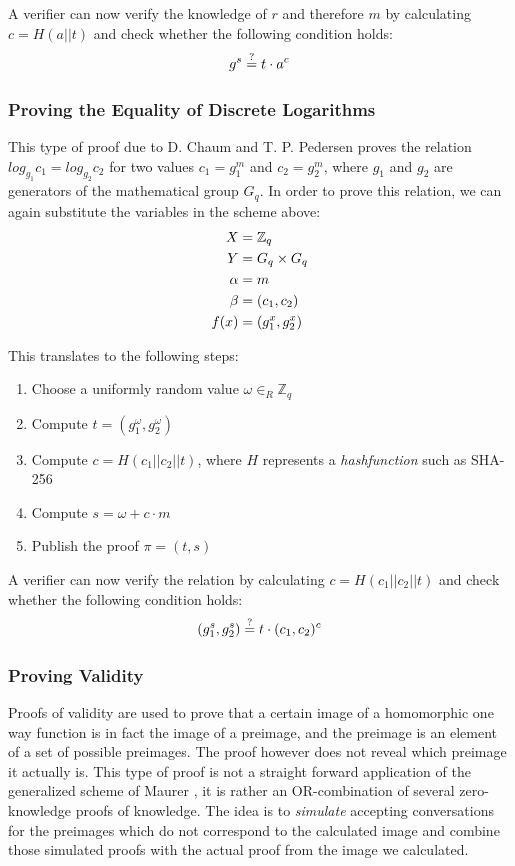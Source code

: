\documentclass[numbers=noenddot, abstract=on, a4paper, headsepline,
footsepline, oneside, draft=off]{scrreprt}
\begin{document}
A verifier can now verify the knowledge of $r$ and therefore $m$ by calculating
$c=H(a||t)$ and check whether the following condition holds:
\begin{equation}
	g^s \stackrel{?}{=} t \cdot a^c \notag
\end{equation}

\subsubsection{Proving the Equality of Discrete Logarithms}
\label{sec:proofeqdlog}
This type of proof due to D. Chaum and T. P. Pedersen \cite{CP93}
 proves the relation $log_{g_1} c_1 = log_{g_2} c_2 $ for two values $c_1 =
g_1^m$ and $c_2 = g_2^m$, where $g_1$ and $g_2$ are generators of the
mathematical group $G_q$. In order to prove this relation, we can again
substitute the variables in the scheme above:
\begin{align}
  X &= \mathbb{Z}_q \notag \\
  Y &= G_q \times G_q \notag \\
  \alpha &=m \notag \\
  \beta &=(c_1, c_2) \notag \\
  f(x) &= (g_1^x, g_2^x) \notag
\end{align} 

This translates to the following steps:

\begin{enumerate}
  \item Choose a uniformly random value $\omega \in_R \mathbb{Z}_q$
  \item Compute $t=(g_1^\omega, g_2^\omega)$
  \item Compute $c=H(c_1||c_2||t)$, where $H$ represents a
  \emph{hashfunction} such as SHA-256
  \item Compute $s=\omega + c \cdot m$
  \item Publish the proof $\pi = (t,s)$
\end{enumerate}

A verifier can now verify the relation by calculating
$c=H(c_1||c_2||t)$ and check whether the following condition holds:
\begin{equation}
	(g_1^s, g_2^s) \stackrel{?}{=} t \cdot (c_1, c_2)^c \notag
\end{equation}


\subsubsection{Proving Validity}
\label{sec:proofofvalidity}
Proofs of validity are used to prove that a certain image of a homomorphic one
way function is in fact the image of a preimage, and the preimage is an element
of a set of possible preimages. The proof however does not reveal which preimage
it actually is. This type of proof is not a straight forward application of the
generalized scheme of Maurer \cite{Maurer09}, it is rather an OR-combination of
several zero-knowledge proofs of knowledge. The idea is to \emph{simulate}
accepting conversations for the preimages which do not correspond to the
calculated image and combine those simulated proofs with the actual proof from
the image we calculated.
\end{document}
